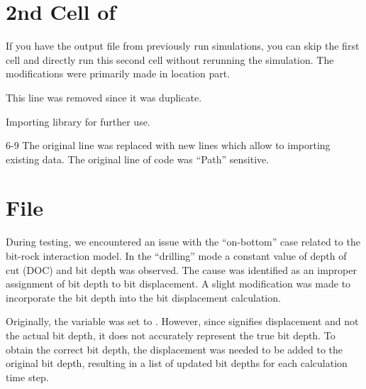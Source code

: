 \section{2nd Cell of }
If you have the output file from previously run simulations, you can skip the first cell and directly run this second cell without rerunning the simulation. The modifications were primarily made in location part.
\begin{codemodifications}

\begin{codemodification}{1}
This line was removed since it was duplicate.
\end{codemodification}

\begin{codemodification}{5}
Importing  library for further use.
\end{codemodification}

\begin{codemodification}{6-9}
The original line was replaced with new lines which allow to importing existing data.  The original line of code was ``Path'' sensitive.
\end{codemodification}

\end{codemodifications}

\section{File }
During testing, we encountered an issue with the ``on-bottom'' case related to the bit-rock interaction model. In the ``drilling'' mode a constant value of depth of cut (DOC) and bit depth was observed. The cause was identified as an improper assignment of bit depth to bit displacement. A slight modification was made to incorporate the bit depth into the bit displacement calculation. 


\begin{codemodifications}

\begin{codemodification}{29}
Originally, the variable  was set to . However, since  signifies displacement and not the actual bit depth, it does not accurately represent the true bit depth. To obtain the correct bit depth, the displacement was needed to be added to the original bit depth, resulting in a list of updated bit depths for each calculation time step.
\end{codemodification}
\end{codemodifications}

